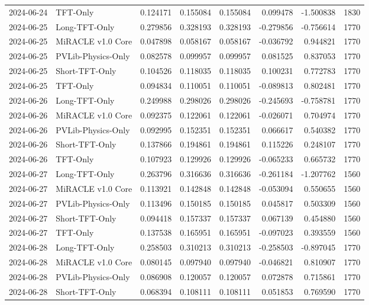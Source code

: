 \begin{tabular}{llrrrrrr}
2024-06-24 & TFT-Only & 0.124171 & 0.155084 & 0.155084 & 0.099478 & -1.500838 & 1830 \\
2024-06-25 & Long-TFT-Only & 0.279856 & 0.328193 & 0.328193 & -0.279856 & -0.756614 & 1770 \\
2024-06-25 & MiRACLE v1.0 Core & 0.047898 & 0.058167 & 0.058167 & -0.036792 & 0.944821 & 1770 \\
2024-06-25 & PVLib-Physics-Only & 0.082578 & 0.099957 & 0.099957 & 0.081525 & 0.837053 & 1770 \\
2024-06-25 & Short-TFT-Only & 0.104526 & 0.118035 & 0.118035 & 0.100231 & 0.772783 & 1770 \\
2024-06-25 & TFT-Only & 0.094834 & 0.110051 & 0.110051 & -0.089813 & 0.802481 & 1770 \\
2024-06-26 & Long-TFT-Only & 0.249988 & 0.298026 & 0.298026 & -0.245693 & -0.758781 & 1770 \\
2024-06-26 & MiRACLE v1.0 Core & 0.092375 & 0.122061 & 0.122061 & -0.026071 & 0.704974 & 1770 \\
2024-06-26 & PVLib-Physics-Only & 0.092995 & 0.152351 & 0.152351 & 0.066617 & 0.540382 & 1770 \\
2024-06-26 & Short-TFT-Only & 0.137866 & 0.194861 & 0.194861 & 0.115226 & 0.248107 & 1770 \\
2024-06-26 & TFT-Only & 0.107923 & 0.129926 & 0.129926 & -0.065233 & 0.665732 & 1770 \\
2024-06-27 & Long-TFT-Only & 0.263796 & 0.316636 & 0.316636 & -0.261184 & -1.207762 & 1560 \\
2024-06-27 & MiRACLE v1.0 Core & 0.113921 & 0.142848 & 0.142848 & -0.053094 & 0.550655 & 1560 \\
2024-06-27 & PVLib-Physics-Only & 0.113496 & 0.150185 & 0.150185 & 0.045817 & 0.503309 & 1560 \\
2024-06-27 & Short-TFT-Only & 0.094418 & 0.157337 & 0.157337 & 0.067139 & 0.454880 & 1560 \\
2024-06-27 & TFT-Only & 0.137538 & 0.165951 & 0.165951 & -0.097023 & 0.393559 & 1560 \\
2024-06-28 & Long-TFT-Only & 0.258503 & 0.310213 & 0.310213 & -0.258503 & -0.897045 & 1770 \\
2024-06-28 & MiRACLE v1.0 Core & 0.080145 & 0.097940 & 0.097940 & -0.046821 & 0.810907 & 1770 \\
2024-06-28 & PVLib-Physics-Only & 0.086908 & 0.120057 & 0.120057 & 0.072878 & 0.715861 & 1770 \\
2024-06-28 & Short-TFT-Only & 0.068394 & 0.108111 & 0.108111 & 0.051853 & 0.769590 & 1770 \\

\end{tabular}

